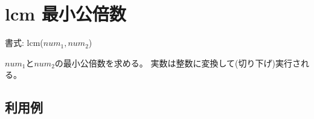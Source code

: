 
%

\section{lcm 最小公倍数\label{sect:lcm}}

書式: lcm($num_1,num_2$)

$num_1$と$num_2$の最小公倍数を求める。
実数は整数に変換して(切り下げ)実行される。

\subsection*{利用例}


%

